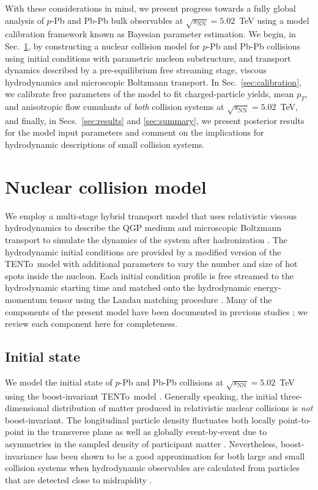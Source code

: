 \documentclass[aps,prc,reprint,amsmath,nofootinbib]{revtex4-1}
\newcommand{\trento}{T\raisebox{-0.5ex}{R}ENTo}
\newcommand{\sqrts}{\sqrt{s_\mathrm{NN}}}
\begin{document}
With these considerations in mind, we present progress towards a fully global analysis of $p$-Pb and Pb-Pb bulk observables at $\sqrts=5.02$~TeV using a model calibration framework known as Bayesian parameter estimation.
We begin, in Sec.~\ref{sec:model}, by constructing a nuclear collision model for $p$-Pb and Pb-Pb collisions using initial conditions with parametric nucleon substructure, and transport dynamics described by a pre-equilibrium free streaming stage, viscous hydrodynamics and microscopic Boltzmann transport.
In Sec.~\ref{sec:calibration}, we calibrate free parameters of the model to fit charged-particle yields, mean $p_T$, and anisotropic flow cumulants of \emph{both} collision systems at $\sqrts=5.02$~TeV, and finally, in Secs.~\ref{sec:results} and \ref{sec:summary}, we present posterior results for the model input parameters and comment on the implications for hydrodynamic descriptions of small collision systems.


\section{Nuclear collision model}
\label{sec:model}

We employ a multi-stage hybrid transport model that uses relativistic viscous hydrodynamics to describe the QGP medium and microscopic Boltzmann transport to simulate the dynamics of the system after hadronization \cite{Shen:2014vra, Bernhard:2016tnd}.
The hydrodynamic initial conditions are provided by a modified version of the \trento\ model \cite{Moreland:2014oya} with additional parameters to vary the number and size of hot spots inside the nucleon.
Each initial condition profile is free streamed to the hydrodynamic starting time and matched onto the hydrodynamic energy-momentum tensor using the Landau matching procedure \cite{Broniowski:2008qk, Heinz:2015arc}.
Many of the components of the present model have been documented in previous studies \cite{Moreland:2014oya, Bernhard:2016tnd, Bernhard:2018hnz}; we review each component here for completeness.

\subsection{Initial state}
\label{sec:initial_state}

We model the initial state of $p$-Pb and Pb-Pb collisions at $\sqrts=5.02$~TeV using the boost-invariant \trento\ model \cite{Moreland:2014oya}.
Generally speaking, the initial three-dimensional distribution of matter produced in relativistic nuclear collisions is \emph{not} boost-invariant.
The longitudinal particle density fluctuates both locally point-to-point in the transverse plane as well as globally event-by-event due to asymmetries in the sampled density of participant matter \cite{Ke:2016jrd, Bozek:2010vz}.
Nevertheless, boost-invariance has been shown to be a good approximation for both large and small collision systems when hydrodynamic observables are calculated from particles that are detected close to midrapidity \cite{Shen:2016zpp}.
\end{document}
